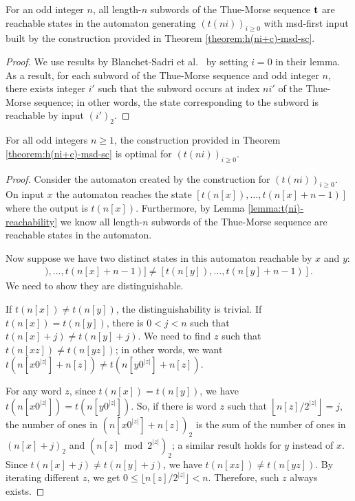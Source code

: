 \documentclass[12pt,reqno]{article}
\begin{document}
\begin{lemma} \label{lemma:t(ni)-reachability}
    For an odd integer $n$, all length-$n$ subwords of the Thue-Morse sequence $\bf t$ are reachable states in the automaton generating $(t(ni))_{i \geq 0}$ with msd-first input built by the construction provided in Theorem \ref{theorem:h(ni+c)-msd-sc}.
\end{lemma}

\begin{proof}
    We use results by Blanchet-Sadri et al.~\cite[Lemma~12]{blanchet-sadri_abelian_2014} by setting $i=0$ in their lemma. As a result, for each subword of the Thue-Morse sequence and odd integer $n$, there exists integer $i'$ such that the subword occurs at index $ni'$ of the Thue-Morse sequence; in other words, the state corresponding to the subword is reachable by input $(i')_2$.
\end{proof}

\begin{theorem} \label{theorem:t-construction-optimal}
    For all odd integers $n \geq 1$, the construction provided in Theorem \ref{theorem:h(ni+c)-msd-sc} is optimal for $(t(ni))_{i \geq 0}$.
\end{theorem}

\begin{proof}
    Consider the automaton created by the construction for $(t(ni))_{i \geq 0}$. On input $x$ the automaton reaches the state $[t(n[x]), \ldots, t(n[x]+n-1)] $
    where the output is $t(n[x])$.
    Furthermore, by Lemma \ref{lemma:t(ni)-reachability} we know all length-$n$ subwords of the Thue-Morse sequence are reachable states in the automaton.
    
    Now suppose we have two distinct states in this automaton reachable by $x$ and $y$:
    \begin{align*}
        [t(n[x]), \ldots, t(n[x]+n-1)] \neq
        [t(n[y]), \ldots, t(n[y]+n-1)].
    \end{align*}
    We need to show they are distinguishable.
    
    If $t(n[x]) \neq t(n[y])$, the distinguishability is trivial. If $t(n[x]) = t(n[y])$, there is $0 < j < n$ such that $t(n[x] + j ) \neq t(n[y] +j)$. We need to find $z$ such that $t(n[xz]) \neq t(n[yz])$; in other words, we want $t(n[x0^{|z|}] + n[z]) \neq t(n[y0^{|z|}] + n[z])$.
    
    For any word $z$, since $t(n[x]) = t(n[y])$, we have $t(n[x0^{|z|}]) = t(n[y0^{|z|}])$. So, if there is word $z$ such that $\left\lfloor n[z]/2^{|z|}\right\rfloor = j$, the number of ones in $(n[x0^{|z|}] + n[z])_2$ is the sum of the number of ones in $(n[x] + j)_2$ and $(n[z] \bmod 2^{|z|})_2$; a similar result holds for $y$ instead of $x$. Since $t(n[x]+j) \neq t(n[y] + j)$, we have $t(n[xz]) \neq t(n[yz])$.
    By iterating different $z$, we get $ 0 \leq \lfloor n[z]/2^{|z|} \rfloor < n $. Therefore, such $z$ always exists.
\end{proof}
\end{document}
